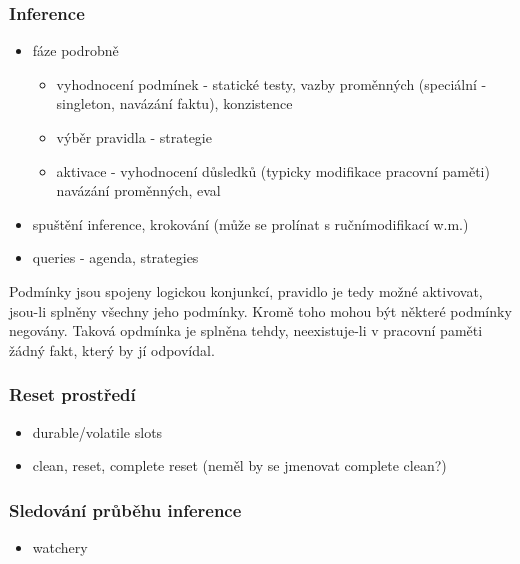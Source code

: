 \subsubsection{Inference}
\label{inference}
\begin{framed}
  \begin{itemize}
    \item fáze podrobně
    \begin{itemize}
      \item vyhodnocení podmínek - statické testy, vazby proměnných (speciální -
        singleton, navázání faktu), konzistence
      \item výběr pravidla - strategie
      \item aktivace - vyhodnocení důsledků (typicky modifikace pracovní paměti)
        navázání proměnných, eval
    \end{itemize}
    \item spuštění inference, krokování (může se prolínat s ručnímodifikací w.m.)
    \item queries - agenda, strategies
  \end{itemize}
\end{framed}

Podmínky jsou spojeny logickou konjunkcí, pravidlo je tedy možné aktivovat,
jsou-li splněny všechny jeho podmínky. Kromě toho mohou být některé podmínky
negovány. Taková opdmínka je splněna tehdy, neexistuje-li v pracovní paměti
žádný fakt, který by jí odpovídal.

\subsubsection{Reset prostředí}
\begin{framed}
  \begin{itemize}
    \item durable/volatile slots
    \item clean, reset, complete reset (neměl by se jmenovat complete clean?)
  \end{itemize}
\end{framed}

\subsubsection{Sledování průběhu inference}
\label{inference tracing}
\begin{framed}
  \begin{itemize}
    \item watchery
  \end{itemize}
\end{framed}

